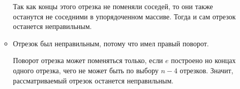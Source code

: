 \documentclass[letterpaper,12pt]{article}
\begin{document}
\begin{enumerate}
\begin{itemize}
                  Так как концы этого отрезка не поменяли соседей,
                  то они также останутся не соседними в упорядоченном массиве.
                  Тогда и сам отрезок останется неправильным.

                  \item Отрезок был неправильным, потому что имел правый поворот.

                  Поворот отрезка может поменяться только,
                  если $e$ построено но концах одного отрезка,
                  чего не может быть по выбору $n-4$ отрезков.
                  Значит, рассматриваемый отрезок останется неправильным. 

            \end{itemize}
\end{enumerate}
\end{document}
